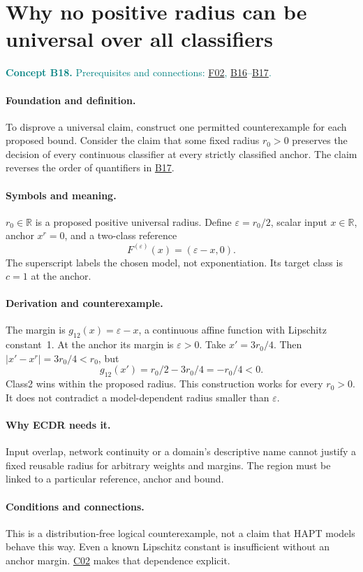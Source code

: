 \documentclass[11pt,a4paper]{article}
\newcommand{\R}{\mathbb R}
\newcommand{\conceptid}{Front matter}
\newcommand{\concept}[3]{\clearpage\renewcommand{\conceptid}{#1}%
\section{#2}\label{concept:#1}%
\textcolor{teal}{\textbf{Concept #1.} Prerequisites and connections: #3.}\par
\typeout{ECDR-CONCEPT-START #1 PAGE=\thepage}}
\begin{document}
\concept{B18}{Why no positive radius can be universal over all classifiers}{\hyperref[concept:F02]{F02}, \hyperref[concept:B16]{B16}--\hyperref[concept:B17]{B17}}
\paragraph{Foundation and definition.}
To disprove a universal claim, construct one permitted counterexample for
each proposed bound. Consider the claim that some fixed radius $r_0>0$
preserves the decision of every continuous classifier at every strictly
classified anchor. The claim reverses the order of quantifiers in \hyperref[concept:B17]{B17}.
\paragraph{Symbols and meaning.}
$r_0\in\R$ is a proposed positive universal radius. Define
$\varepsilon=r_0/2$, scalar input $x\in\R$, anchor $x^r=0$, and a
two-class reference
\[
 F^{(\varepsilon)}(x)=(\varepsilon-x,0).
\]
The superscript labels the chosen model, not exponentiation. Its target
class is $c=1$ at the anchor.
\paragraph{Derivation and counterexample.}
The margin is $g_{12}(x)=\varepsilon-x$, a continuous affine function
with Lipschitz constant~1. At the anchor its margin is $\varepsilon>0$.
Take $x'=3r_0/4$. Then $|x'-x^r|=3r_0/4<r_0$, but
\[
 g_{12}(x')=r_0/2-3r_0/4=-r_0/4<0.
\]
Class2 wins within the proposed radius. This construction works for every
$r_0>0$. It does not contradict a model-dependent radius smaller than
$\varepsilon$.
\paragraph{Why ECDR needs it.}
Input overlap, network continuity or a domain's descriptive name cannot
justify a fixed reusable radius for arbitrary weights and margins.
The region must be linked to a particular reference, anchor and bound.
\paragraph{Conditions and connections.}
This is a distribution-free logical counterexample, not a claim that HAPT
models behave this way. Even a known Lipschitz constant is insufficient
without an anchor margin. \hyperref[concept:C02]{C02} makes that dependence explicit.
\par\label{endconcept:B18}
\end{document}
